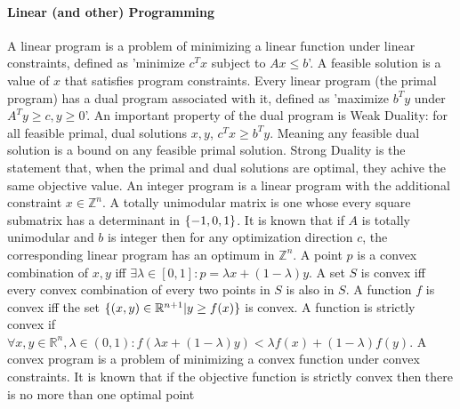 \paragraph{Linear (and other) Programming}
A linear program is a problem of minimizing a linear function under linear constraints, defined as 'minimize $c^Tx$ subject to $Ax\leq b$'. A feasible solution is a value of $x$ that satisfies program constraints. Every linear program (the primal program) has a dual program associated with it, defined as 'maximize $b^Ty$ under $A^Ty\geq c, y\geq 0$'. An important property of the dual program is Weak Duality: for all feasible primal, dual solutions $x,y$, $c^Tx\geq b^T y$. Meaning any feasible dual solution is a bound on any feasible primal solution. Strong Duality is the statement that, when the primal and dual solutions are optimal, they achive the same objective value. An integer program is a linear program with the additional constraint $x\in\mathbb{Z}^n$.
A totally unimodular matrix is one whose every square submatrix has a determinant in $\{-1,0,1\}$. It is known that if $A$ is totally unimodular and $b$ is integer then for any optimization direction $c$, the corresponding linear program has an optimum in $\mathbb{Z}^n$.
A point $p$ is a convex combination of $x,y$ iff $\exists\lambda\in[0,1]:p=\lambda x+(1-\lambda)y$. A set $S$ is convex iff every convex combination of every two points in $S$ is also in $S$. A function $f$ is convex iff the set $\{(x,y)\in\mathbb{R}^{n+1}|y\geq f(x)\}$ is convex. A function is strictly convex if $\forall x,y\in\mathbb{R}^n,\lambda\in(0,1):f(\lambda x+(1-\lambda)y)<\lambda f(x)+(1-\lambda)f(y)$. A convex program is a problem of minimizing a convex function under convex constraints. It is known that if the objective function is strictly convex then there is no more than one optimal point
